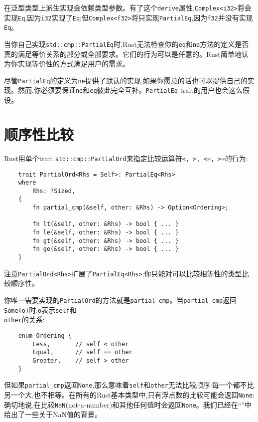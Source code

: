在泛型类型上派生实现会依赖类型参数。有了这个\texttt{derive}属性,\texttt{Complex<i32>}将会实现\texttt{Eq},因为\texttt{i32}实现了\texttt{Eq};但\texttt{Complex<f32>}将只实现\texttt{PartialEq},因为\texttt{f32}并没有实现\texttt{Eq}。

当你自己实现\texttt{std::cmp::PartialEq}时,Rust无法检查你的\texttt{eq}和\texttt{ne}方法的定义是否真的满足等价关系的部分或全部要求。它们的行为可以是任意的。Rust简单地认为你实现等价性的方式满足用户的需求。

尽管\texttt{PartialEq}的定义为\texttt{ne}提供了默认的实现,如果你愿意的话也可以提供自己的实现。然而,你必须要保证\texttt{ne}和\texttt{eq}彼此完全互补。\texttt{PartialEq} trait的用户也会这么假设。

\section{顺序性比较}\label{cmp}

Rust用单个trait \texttt{std::cmp::PartialOrd}来指定比较运算符\texttt{<, >, <=, >=}的行为:
\begin{verbatim}
    trait PartialOrd<Rhs = Self>: PartialEq<Rhs>
    where
        Rhs: ?Sized,
    {
        fn partial_cmp(&self, other: &Rhs) -> Option<Ordering>;

        fn lt(&self, other: &Rhs) -> bool { ... }
        fn le(&self, other: &Rhs) -> bool { ... }
        fn gt(&self, other: &Rhs) -> bool { ... }
        fn ge(&self, other: &Rhs) -> bool { ... }
    }
\end{verbatim}

注意\texttt{PartialOrd<Rhs>}扩展了\texttt{PartialEq<Rhs>}:你只能对可以比较相等性的类型比较顺序性。

你唯一需要实现的\texttt{PartialOrd}的方法就是\texttt{partial\_cmp}。当\texttt{partial\_cmp}返回\texttt{Some(o)}时,\texttt{o}表示\texttt{self}和\\
\texttt{other}的关系:
\begin{verbatim}
    enum Ordering {
        Less,       // self < other
        Equal,      // self == other
        Greater,    // self > other
    }
\end{verbatim}

但如果\texttt{partial\_cmp}返回\texttt{None},那么意味着\texttt{self}和\texttt{other}无法比较顺序:每一个都不比另一个大,也不相等。在所有的Rust基本类型中,只有浮点数的比较可能会返回\texttt{None}:确切地说,在比较\texttt{NaN}(not-a-number)和其他任何值时会返回\texttt{None}。我们已经在“”中给出了一些关于NaN值的背景。

